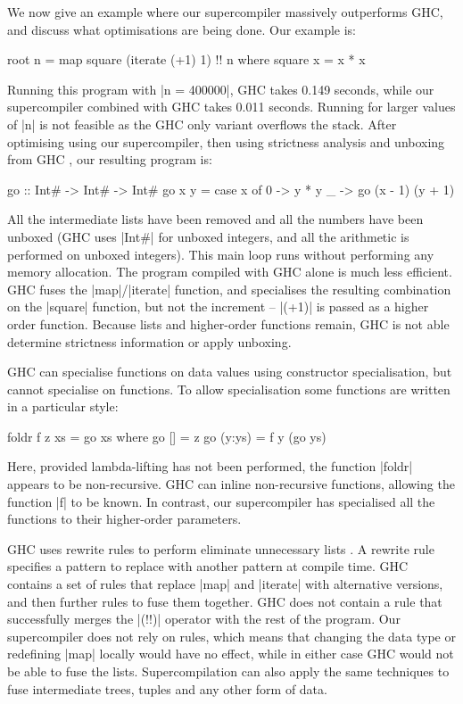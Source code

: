 \documentclass[draft]{sigplanconf}
\begin{document}
We now give an example where our supercompiler massively outperforms GHC, and discuss what optimisations are being done. Our example is:

\begin{code}
root n = map square (iterate (+1) 1) !! n
    where square x = x * x
\end{code}

Running this program with |n = 400000|, GHC takes 0.149 seconds, while our supercompiler combined with GHC takes 0.011 seconds. Running for larger values of |n| is not feasible as the GHC only variant overflows the stack. After optimising using our supercompiler, then using strictness analysis and unboxing from GHC \cite{spj:unboxing}, our resulting program is:

\begin{code}
go :: Int# -> Int# -> Int#
go x y = case x of
    0 -> y * y
    _ -> go (x - 1) (y + 1)
\end{code}

All the intermediate lists have been removed and all the numbers have been unboxed (GHC uses |Int#| for unboxed integers, and all the arithmetic is performed on unboxed integers). This main loop runs without performing any memory allocation. The program compiled with GHC alone is much less efficient. GHC fuses the |map|/|iterate| function, and specialises the resulting combination on the |square| function, but not the increment -- |(+1)| is passed as a higher order function. Because lists and higher-order functions remain, GHC is not able determine strictness information or apply unboxing.

GHC can specialise functions on data values using constructor specialisation, but cannot specialise on functions. To allow specialisation some functions are written in a particular style:

\begin{code}
foldr f z xs = go xs
    where  go []      = z
           go (y:ys)  = f y (go ys)
\end{code}

Here, provided lambda-lifting has not been performed, the function |foldr| appears to be non-recursive. GHC can inline non-recursive functions, allowing the function |f| to be known. In contrast, our supercompiler has specialised all the functions to their higher-order parameters.

GHC uses rewrite rules to perform eliminate unnecessary lists \cite{spj:rules}. A rewrite rule specifies a pattern to replace with another pattern at compile time. GHC contains a set of rules that replace |map| and |iterate| with alternative versions, and then further rules to fuse them together. GHC does not contain a rule that successfully merges the |(!!)| operator with the rest of the program. Our supercompiler does not rely on rules, which means that changing the data type or redefining |map| locally would have no effect, while in either case GHC would not be able to fuse the lists. Supercompilation can also apply the same techniques to fuse intermediate trees, tuples and any other form of data.
\end{document}
